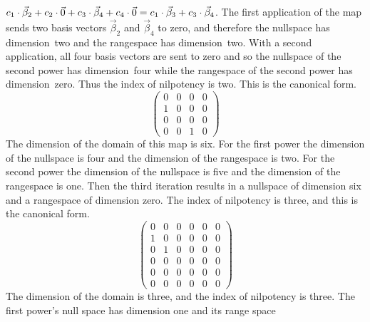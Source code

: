 \begin{exercises}
\begin{answer}
\begin{exparts}
          $c_1\cdot \vec{\beta}_2+c_2\cdot \vec{0}
            +c_3\cdot \vec{\beta}_4+c_4\cdot \vec{0}
           =c_1\cdot \vec{\beta}_3+c_3\cdot\vec{\beta}_4$.
          The first application of the map
          sends two basis vectors $\vec{\beta}_2$ and
          $\vec{\beta}_4$ to zero,
          and therefore the nullspace has dimension~two and the rangespace
          has dimension~two.
          With a second application, all four basis vectors are sent to
          zero and so the nullspace of the second power has dimension~four
          while the rangespace of the second power has dimension~zero.
          Thus the index of nilpotency is two.
          This is the canonical form.
          \begin{equation*}
            \begin{pmatrix}
              0  &0  &0  &0  \\
              1  &0  &0  &0  \\
              0  &0  &0  &0  \\
              0  &0  &1  &0
            \end{pmatrix}
          \end{equation*}
        \partsitem The dimension of the domain of this map is six.
          For the first power the dimension of the nullspace is four
          and the dimension of the rangespace is two.
          For the second power the dimension of the nullspace is five
          and the dimension of the rangespace is one.
          Then the third iteration results in a nullspace of dimension
          six and a rangespace of dimension zero.
          The index of nilpotency is three, and this is the
          canonical form.
          \begin{equation*}
            \begin{pmatrix}
              0  &0  &0  &0  &0  &0  \\
              1  &0  &0  &0  &0  &0  \\
              0  &1  &0  &0  &0  &0  \\
              0  &0  &0  &0  &0  &0  \\              
              0  &0  &0  &0  &0  &0  \\              
              0  &0  &0  &0  &0  &0  
            \end{pmatrix}
          \end{equation*}
        \partsitem The dimension of the domain is three, and the index of 
          nilpotency is three.
          The first power's null space has dimension one and its range space

\end{exparts}
\end{answer}
\end{exercises}
